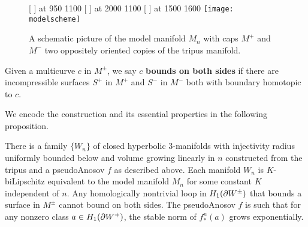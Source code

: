  \vspace{1cm}
\begin{figure}[H]
\small\hair 2pt
  [ ] at 950 1100
  [ ] at 2000 1100
  [ ] at 1500 1600
\endlabellist
\centering
\texttt{[image: modelscheme]}
\caption{ A schematic picture of the model manifold $M_n$ with caps $M^+$ and $M^-$ two oppositely oriented copies of the tripus manifold.}
\label{fig:caps_schematic}
\end{figure}

Given a multicurve $c$ in $M^{\pm}$, we say $c$ \textbf{bounds on both sides} if there are incompressible surfaces $S^+$ in $M^+$ and $S^-$ in $M^-$ both with boundary homotopic to $c$.

We encode the construction and its essential properties in the following proposition.

\begin{prop}  \label{prop:6.3}There is a family $\{W_n\}$ of closed hyperbolic 3-manifolds with injectivity radius uniformly bounded below and volume growing linearly in $n$ constructed from the tripus and a pseudoAnosov $f$ as described above. Each manifold $W_n$ is $K$-biLipschitz equivalent to the model manifold $M_n$ for some constant $K$ independent of $n$. Any homologically nontrivial loop in $H_1(\partial W^{\pm})$ that bounds a surface in $M^{\pm}$ cannot bound on both sides. The pseudoAnosov $f$ is such that for any nonzero class $a\in H_1(\partial W^+)$, the stable norm of $f_*^n(a)$ grows exponentially.
\end{prop}


